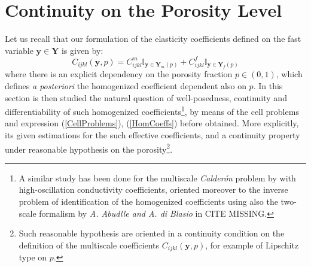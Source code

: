 \section{Continuity on the Porosity Level}
Let us recall that our formulation of the elasticity coefficients defined on the fast variable $\mathbf{y} \in \mathbf{Y}$ is given by:
\begin{equation*}
    C_{ijkl}(\mathbf{y}, p) = C_{ijkl}^{m} \mathbb{I}_{\mathbf{y} \in \mathbf{Y}_m(p)} + C_{ijkl}^{f} \mathbb{I}_{\mathbf{y} \in \mathbf{Y}_f(p)}
\end{equation*}
where there is an explicit dependency on the porosity fraction $p \in (0,1)$, which defines \textit{a posteriori} the homogenized coefficient dependent also on $p$. In this section is then studied the natural question of well-posedness, continuity and differentiability of such homogenized coefficients\footnote{A similar study has been done for the multiscale \textit{Calderón} problem by with high-oscillation conductivity coefficients, oriented moreover to the inverse problem of identification of the homogenized coefficients using also the two-scale formalism by \textit{A. Abudlle and A. di Blasio} in CITE MISSING.}, by means of the cell problems and expression (\ref{CellProblems}), (\ref{HomCoeffs}) before obtained.
More explicitly, its given estimations for the such effective coefficients, and a continuity property under reasonable hypothesis on the porosity\footnote{Such reasonable hypothesis are oriented in a continuity condition on the definition of the multiscale coefficients $C_{ijkl}(\mathbf{y},p)$, for example of Lipschitz type on $p$.}.

